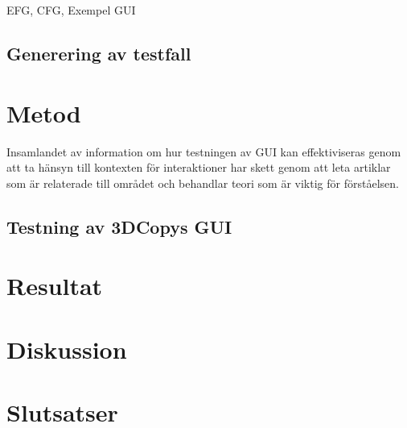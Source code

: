 EFG, CFG, Exempel GUI

\subsection{Generering av testfall}



\section{Metod}
\label{sec:method-holmberg}

Insamlandet av information om hur testningen av GUI kan effektiviseras genom att ta hänsyn till kontexten för interaktioner har skett genom att leta artiklar som är relaterade till området och behandlar teori som är viktig för förståelsen.

\subsection{Testning av 3DCopys GUI}


\section{Resultat}
\label{sec:results-holmberg}


\section{Diskussion}
\label{sec:discussion-holmberg}


\section{Slutsatser}
\label{sec:conclusions-holmberg}


